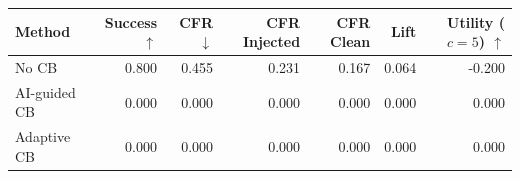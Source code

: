\begin{tabular}{lrrrrrr}
\toprule
Method & Success $\uparrow$ & CFR $\downarrow$ & CFR Injected & CFR Clean & Lift & Utility ($c=5$) $\uparrow$ \\
\midrule
No CB & 0.800 & 0.455 & 0.231 & 0.167 & 0.064 & -0.200 \\
AI-guided CB & 0.000 & 0.000 & 0.000 & 0.000 & 0.000 & 0.000 \\
Adaptive CB & 0.000 & 0.000 & 0.000 & 0.000 & 0.000 & 0.000 \\
\bottomrule
\end{tabular}
